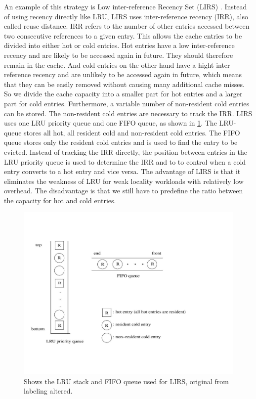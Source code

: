 \documentclass[
	12pt,
	a4paper,
	abstract,
	bibliography=totoc,
	chapterprefix,
	headings=openright,
	numbers=endperiod,
	parskip=half,
	twoside,
]{scrreprt}
\begin{document}
An example of this strategy is Low inter-reference Recency Set (LIRS) \cite{10.1145/511399.511340}.
Instead of using recency directly like LRU, LIRS uses inter-reference recency (IRR), also called reuse distance.
IRR refers to the number of other entries accessed between two consecutive references to a given entry.
This allows the cache entries to be divided into either hot or cold entries.
Hot entries have a low inter-reference recency and are likely to be accessed again in future.
They should therefore remain in the cache.
And cold entries on the other hand have a hight inter-reference recency and are unlikely to be accessed again in future, which means that they can be easily removed without causing many additional cache misses.
So we divide the cache capacity into a smaller part for hot entries and a larger part for cold entries.
Furthermore, a variable number of non-resident cold entries can be stored.
The non-resident cold entries are necessary to track the IRR.
LIRS uses one LRU priority queue and one FIFO queue, as shown in \ref{fig:lirs queues}.
The LRU-queue stores all hot, all resident cold and non-resident cold entries.
The FIFO queue stores only the resident cold entries and is used to find the entry to be evicted.
Instead of tracking the IRR directly, the position between entries in the LRU priority queue is used to determine the IRR and to 
to control when a cold entry converts to a hot entry and vice versa.
The advantage of LIRS is that it eliminates the weakness of LRU for weak locality workloads with relatively low overhead.
The disadvantage is that we still have to predefine the ratio between the capacity for hot and cold entries.

\begin{figure}[ht]
	\centering
	\includegraphics[scale=0.5]{lirs_queues.jpg}
	\caption{Shows the LRU stack and FIFO queue used for LIRS, original from \cite{10.1145/511399.511340} labeling  altered.}
		\label{fig:lirs queues}
\end{figure}
\end{document}
